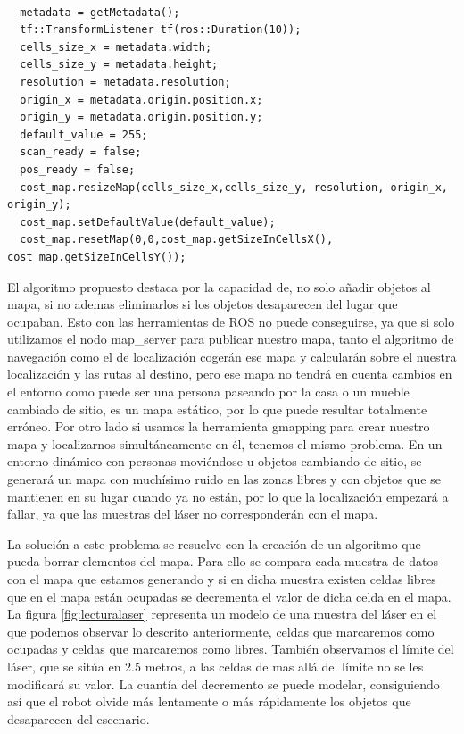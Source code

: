 \renewcommand{\lstlistingname}{Código}
\begin{lstlisting}[caption=Inicialización del cost\_map correspondiente al mapa de corto plazo, label={lst:initcostmap}]

  metadata = getMetadata();
  tf::TransformListener tf(ros::Duration(10));
  cells_size_x = metadata.width;
  cells_size_y = metadata.height;
  resolution = metadata.resolution;
  origin_x = metadata.origin.position.x;
  origin_y = metadata.origin.position.y;
  default_value = 255;
  scan_ready = false;
  pos_ready = false;
  cost_map.resizeMap(cells_size_x,cells_size_y, resolution, origin_x, origin_y);
  cost_map.setDefaultValue(default_value);
  cost_map.resetMap(0,0,cost_map.getSizeInCellsX(), cost_map.getSizeInCellsY());
\end{lstlisting}


El algoritmo propuesto destaca por la capacidad de, no solo añadir objetos al mapa, si no ademas eliminarlos si los objetos desaparecen del lugar que ocupaban. Esto con las herramientas de ROS no puede conseguirse, ya que si solo utilizamos el nodo map\_server para publicar nuestro mapa, tanto el algoritmo de navegación como el de localización cogerán ese mapa y calcularán sobre el nuestra localización y las rutas al destino, pero ese mapa no tendrá en cuenta cambios en el entorno como puede ser una persona paseando por la casa o un mueble cambiado de sitio, es un mapa estático, por lo que puede resultar totalmente erróneo. Por otro lado si usamos la herramienta gmapping para crear nuestro mapa y localizarnos simultáneamente en él, tenemos el mismo problema. En un entorno dinámico con personas moviéndose u objetos cambiando de sitio, se generará un mapa con muchísimo ruido en las zonas libres y con objetos que se mantienen en su lugar cuando ya no están, por lo que la localización empezará a fallar, ya que las muestras del láser no corresponderán con el mapa. 

La solución a este problema se resuelve con la creación de un algoritmo que pueda borrar elementos del mapa. Para ello se compara cada muestra de datos con el mapa que estamos generando y si en dicha muestra existen celdas libres que en el mapa están ocupadas se decrementa el valor de dicha celda en el mapa. La figura \ref{fig:lecturalaser} representa un modelo de una muestra del láser en el que podemos observar lo descrito anteriormente, celdas que marcaremos como ocupadas y celdas que marcaremos como libres. También observamos el límite del láser, que se sitúa en 2.5 metros, a las celdas de mas allá del límite no se les modificará su valor.
La cuantía del decremento se puede modelar, consiguiendo así que el robot olvide más lentamente o más rápidamente los objetos que desaparecen del escenario.


